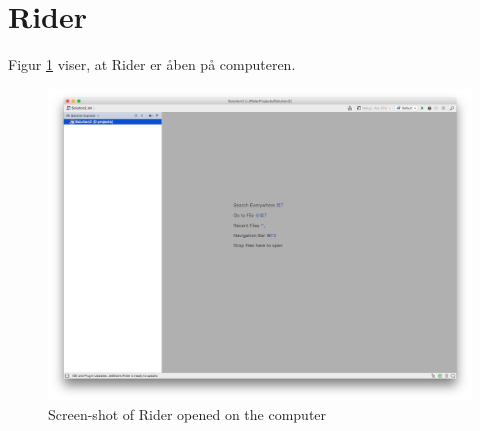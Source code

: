 \section{Rider}
Figur \ref{fig:rider} viser, at Rider er åben på computeren.
\begin{figure}[ht]
  \centering
  \includegraphics[width=1\linewidth]{rider}
  \caption{Screen-shot of Rider opened on the computer}
  \label{fig:rider}
\end{figure}

